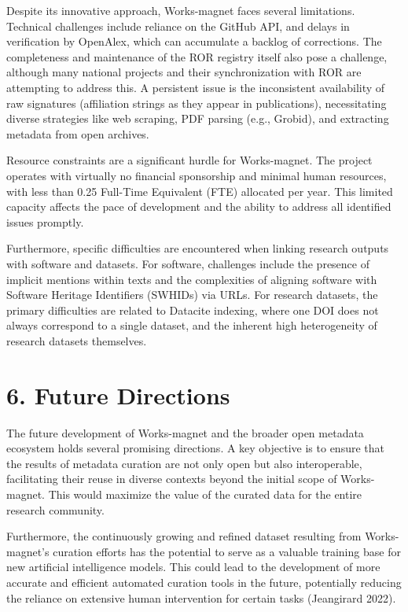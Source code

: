 \documentclass[
]{article}
\begin{document}
Despite its innovative approach, Works-magnet faces several limitations.
Technical challenges include reliance on the GitHub API, and delays in
verification by OpenAlex, which can accumulate a backlog of corrections.
The completeness and maintenance of the ROR registry itself also pose a
challenge, although many national projects and their synchronization
with ROR are attempting to address this. A persistent issue is the
inconsistent availability of raw signatures (affiliation strings as they
appear in publications), necessitating diverse strategies like web
scraping, PDF parsing (e.g., Grobid), and extracting metadata from open
archives.

Resource constraints are a significant hurdle for Works-magnet. The
project operates with virtually no financial sponsorship and minimal
human resources, with less than 0.25 Full-Time Equivalent (FTE)
allocated per year. This limited capacity affects the pace of
development and the ability to address all identified issues promptly.

Furthermore, specific difficulties are encountered when linking research
outputs with software and datasets. For software, challenges include the
presence of implicit mentions within texts and the complexities of
aligning software with Software Heritage Identifiers (SWHIDs) via URLs.
For research datasets, the primary difficulties are related to Datacite
indexing, where one DOI does not always correspond to a single dataset,
and the inherent high heterogeneity of research datasets themselves.

\hypertarget{future-directions}{%
\section{6. Future Directions}\label{future-directions}}

The future development of Works-magnet and the broader open metadata
ecosystem holds several promising directions. A key objective is to
ensure that the results of metadata curation are not only open but also
interoperable, facilitating their reuse in diverse contexts beyond the
initial scope of Works-magnet. This would maximize the value of the
curated data for the entire research community.

Furthermore, the continuously growing and refined dataset resulting from
Works-magnet's curation efforts has the potential to serve as a valuable
training base for new artificial intelligence models. This could lead to
the development of more accurate and efficient automated curation tools
in the future, potentially reducing the reliance on extensive human
intervention for certain tasks (Jeangirard 2022).
\end{document}
